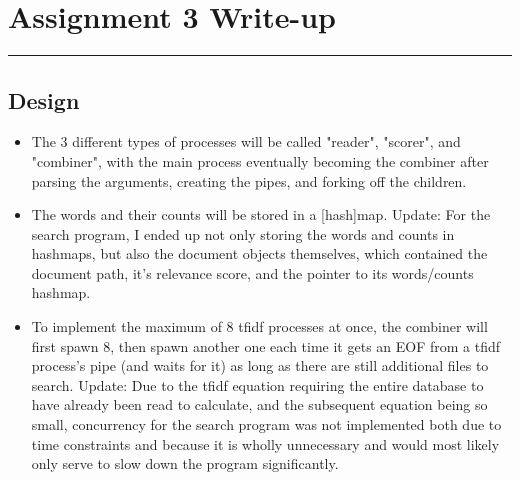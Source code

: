 \documentclass[letterpaper,10pt,fleqn]{article}
\numberwithin{equation}{section}
\begin{document}

\section*{Assignment 3 Write-up}
\hrule

\subsection*{Design}
\begin{itemize}
    \item The 3 different types of processes will be called "reader", "scorer", and "combiner", with the main process eventually becoming the combiner after parsing the arguments, creating the pipes, and forking off the children.
    \item The words and their counts will be stored in a [hash]map.  Update: For the search program, I ended up not only storing the words and counts in hashmaps, but also the document objects themselves, which contained the document path, it's relevance score, and the pointer to its words/counts hashmap.
    \item To implement the maximum of 8 tfidf processes at once, the combiner will first spawn 8, then spawn another one each time it gets an EOF from a tfidf process's pipe (and waits for it) as long as there are still additional files to search.  Update: Due to the tfidf equation requiring the entire database to have already been read to calculate, and the subsequent equation being so small, concurrency for the search program was not implemented both due to time constraints and because it is wholly unnecessary and would most likely only serve to slow down the program significantly.
\end{itemize}
\end{document}
